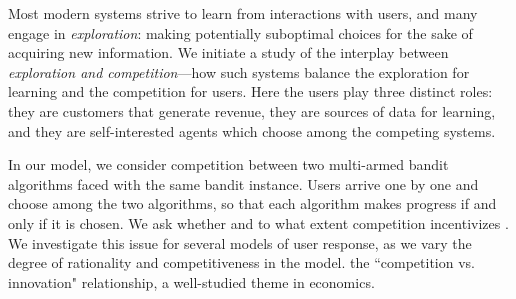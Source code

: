 Most modern systems strive to learn from interactions with users, and many engage in \emph{exploration}: making potentially suboptimal choices for the sake of acquiring new information. We initiate a study of the interplay between \emph{exploration and competition}---how such systems balance the exploration for learning and the competition for users. Here the users play three distinct roles: they are customers that generate revenue, they are sources of data for learning, and they are self-interested agents which choose among the competing systems.

In our model, we consider competition between two multi-armed bandit algorithms faced with the same bandit instance. Users arrive one by one and choose among the two algorithms, so that each algorithm makes progress if and only if it is chosen.
We ask whether and to what extent competition incentivizes . We investigate this issue for several models of user response, as we vary the degree of rationality and competitiveness in the model.  the ``competition vs. innovation" relationship, a well-studied theme in economics.


